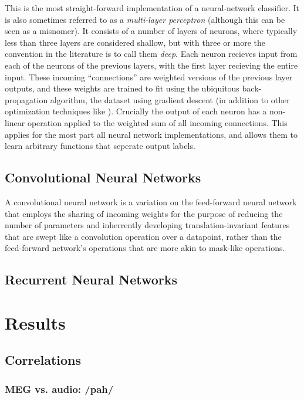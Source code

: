 \documentclass[utf8]{frontiersSCNS} %
\begin{document}
This is the most straight-forward implementation of a neural-network classifier. It is also sometimes referred to as a \emph{multi-layer perceptron} (although this can be seen as a misnomer). It consists of a number of layers of neurons, where typically less than three layers are considered shallow, but with three or more the convention in the literature is to call them \textit{deep}. Each neuron recieves input from each of the neurons of the previous layers, with the first layer recieving the entire input. These incoming ``connections'' are weighted versions of the previous layer outputs, and these weights are trained to fit using the ubiquitous back-propagation algorithm, \cite{Lecunn_phd} the dataset using gradient descent (in addition to other optimization techniques like \cite{adam, rmsprop, etc}). Crucially the output of each neuron has a non-linear operation applied to the weighted sum of all incoming connections. This applies for the most part all neural network implementations, and allows them to learn arbitrary functions that seperate output labels.

\subsection{Convolutional Neural Networks}

A convolutional neural network \cite{} is a variation on the feed-forward neural network that employs the sharing of incoming weights for the purpose of reducing the number of parameters and inherrently developing translation-invariant features that are swept like a convolution operation over a datapoint, rather than the feed-forward network's operations that are more akin to mask-like operations.

\subsection{Recurrent Neural Networks}

\section{Results}

\subsection{Correlations}

\subsubsection{MEG vs. audio: /pah/}
\end{document}
